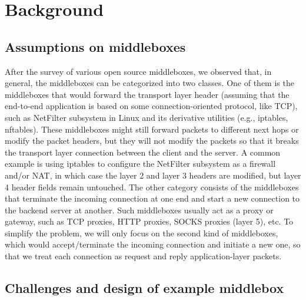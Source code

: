 \section{Background}

\subsection{Assumptions on middleboxes}

After the survey of various open source middleboxes, we observed that, in
general, the middleboxes can be categorized into two classes. One of them is the
middleboxes that would forward the transport layer header (assuming that the
end-to-end application is based on some connection-oriented protocol, like TCP),
such as NetFilter subsystem in Linux and its derivative utilities (e.g.,
iptables, nftables). These middleboxes might still forward packets to different
next hops or modify the packet headers, but they will not modify the packets so
that it breaks the transport layer connection between the client and the server.
A common example is using iptables to configure the NetFilter subsystem as a
firewall and/or NAT, in which case the layer 2 and layer 3 headers are modified,
but layer 4 header fields remain untouched. The other category consists of the
middleboxes that terminate the incoming connection at one end and start a new
connection to the backend server at another. Such middleboxes usually act as a
proxy or gateway, such as TCP proxies, HTTP proxies, SOCKS proxies (layer 5),
etc. To simplify the problem, we will only focus on the second kind of
middleboxes, which would accept/terminate the incoming connection and initiate a
new one, so that we treat each connection as request and reply application-layer
packets.

\subsection{Challenges and design of example middlebox}

